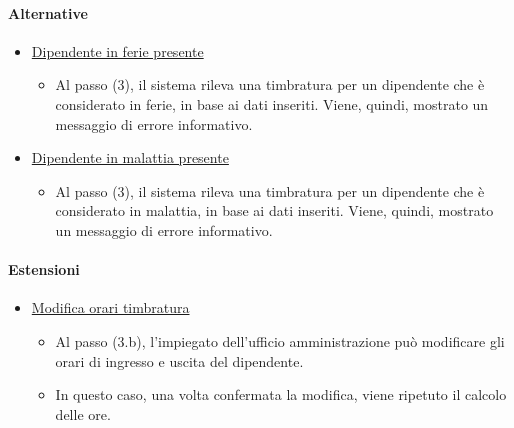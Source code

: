 \paragraph{Alternative}
\begin{itemize}
	\item \underline{Dipendente in ferie presente}
		\begin{itemize}
			\item Al passo (3), il sistema rileva una timbratura per un dipendente che è considerato in ferie, in base ai dati inseriti. Viene, quindi, mostrato un messaggio di errore informativo.
		\end{itemize}
	\item \underline{Dipendente in malattia presente}
		\begin{itemize}
			\item Al passo (3), il sistema rileva una timbratura per un dipendente che è considerato in malattia, in base ai dati inseriti. Viene, quindi, mostrato un messaggio di errore informativo.
		\end{itemize}
\end{itemize}
\paragraph{Estensioni}
\begin{itemize}
	\item \underline{Modifica orari timbratura}
		\begin{itemize}
			\item Al passo (3.b), l'impiegato dell'ufficio amministrazione può modificare gli orari di ingresso e uscita del dipendente.
			\item In questo caso, una volta confermata la modifica, viene ripetuto il calcolo delle ore.
		\end{itemize}
\end{itemize}
